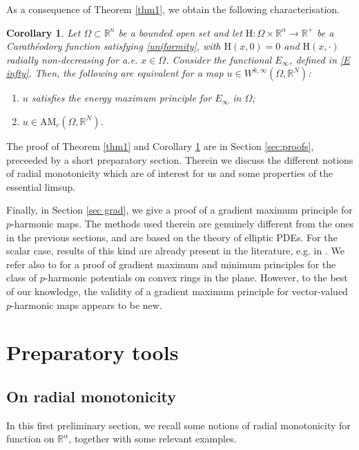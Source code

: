 \documentclass[a4paper,11pt]{article}
\numberwithin{equation}{section}
\newtheorem{Corollary}[Theorem]{Corollary}
\newcommand{\numberset}{\mathbb}
\newcommand{\Om}{\Omega}
\newcommand{\R}{\numberset{R}}
\newcommand{\rom}{\mathrm}
\theoremstyle{definition}
\begin{document}
As a consequence of Theorem \ref{thm1}, we obtain the following characterisation.
\begin{Corollary}\label{thm2}
Let $\Om\subset\R^n$ be a bounded open set and let $\rom{H}:\Om\times\R^\alpha\to\R^+$ be a Carathéodory function satisfying \eqref{uniformity}, with $\rom{H}(x,0)=0$ and $\rom{H}(x, \cdot)$ radially non-decreasing for a.e. $x\in\Om$. Consider the functional $E_\infty$, defined in \eqref{E infty}.
Then, the following are equivalent for a map $u\in W^{k,\infty}(\Om,\R^N)$:
\begin{enumerate}
\item[i)] $u$ satisfies the energy maximum principle for $E_\infty$ in $\Om$;
\item[ii)] $u\in \mathrm {AM}_c(\Om,\R^N)$.
\end{enumerate}
\end{Corollary}
The proof of Theorem \ref{thm1} and Corollary \ref{thm2} are in Section \ref{sec:proofs}, preceeded by a short preparatory section. Therein we discuss the different notions of radial monotonicity which are of interest for us and some properties of the essential limsup. 

Finally, in Section \ref{sec grad}, we give a proof of a gradient maximum principle for $p$-harmonic maps. The methods used therein are genuinely different from the ones in the previous sections, and are based on the theory of elliptic PDEs. For the scalar case, results of this kind are already present in the literature, e.g. in \cite[Chapter 9]{GT}. We refer also to \cite[Appendix B]{PZZ} for a proof of gradient maximum and minimum principles for the class of $p$-harmonic potentials on convex rings in the plane. However, to the best of our knowledge, the validity of a gradient maximum principle for vector-valued $p$-harmonic maps appears to be new.

\section{Preparatory tools}\label{prep}
\subsection{On radial monotonicity}\label{radial mon}
In this first preliminary section, we recall some notions of radial monotonicity for function on $\R^\alpha$, together with some relevant examples.
\end{document}
